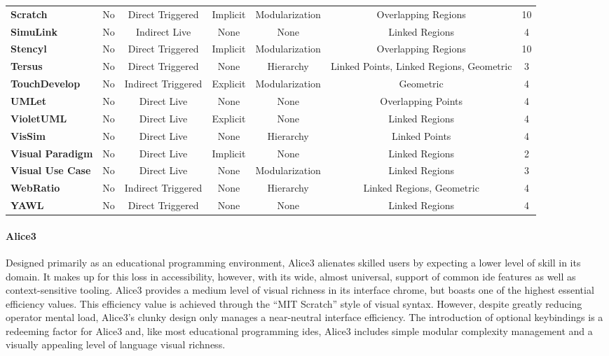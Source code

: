 \begin{table*}
{\begin{tabular}{l|ccc|ccc}
      \textbf{Scratch}    & No	& Direct Triggered	& Implicit	& Modularization	& Overlapping Regions	& 10			\\[1ex]
      \textbf{SimuLink}    & No	& Indirect Live	& None	& None	& Linked Regions	& 4			\\[1ex]
      \textbf{Stencyl}    & No	& Direct Triggered	& Implicit	& Modularization	& Overlapping Regions	& 10			\\[1ex]
      \textbf{Tersus}    & No	& Direct Triggered	& None	& Hierarchy	& Linked Points, Linked Regions, Geometric	& 3			\\[1ex]
      \textbf{TouchDevelop}    & No	& Indirect Triggered	& Explicit	& Modularization	& Geometric	& 4			\\[1ex]
      \textbf{UMLet}    & No	& Direct Live	& None	& None	& Overlapping Points	& 4			\\[1ex]
      \textbf{VioletUML}    & No	& Direct Live	& Explicit	& None	& Linked Regions	& 4			\\[1ex]
      \textbf{VisSim}    & No	& Direct Live	& None	& Hierarchy	& Linked Points	& 4			\\[1ex]
      \textbf{Visual Paradigm}    & No	& Direct Live	& Implicit	& None	& Linked Regions	& 2			\\[1ex]
      \textbf{Visual Use Case}    & No	& Direct Live	& None	& Modularization	& Linked Regions	& 3			\\[1ex]
      \textbf{WebRatio}    & No	& Indirect Triggered	& None	& Hierarchy	& Linked Regions, Geometric	& 4			\\[1ex]
      \textbf{YAWL}    & No	& Direct Triggered	& None	& None	& Linked Regions	& 4			\\[1ex]
		\end{tabular}}
	\caption{Measure of the integration and language syntax of \acp{ide}.}
	\label{tab:integration-langsyn}
\end{table*}
%
\paragraph{Alice3} Designed primarily as an educational programming
environment, Alice3 alienates skilled users by expecting a lower level of
skill in its domain. It makes up for this loss in accessibility, however,
with its wide, almost universal, support of common \ac{ide} features as
well as context-sensitive tooling. Alice3 provides a medium level of visual
richness in its interface chrome, but boasts one of the highest essential
efficiency values. This efficiency value is achieved through the ``MIT
Scratch'' style of visual syntax. However, despite greatly reducing
operator mental load, Alice3's clunky design only manages a near-neutral
interface efficiency. The introduction of optional keybindings is a
redeeming factor for Alice3 and, like most educational programming
\acp{ide}, Alice3 includes simple modular complexity management and a
visually appealing level of language visual richness.

